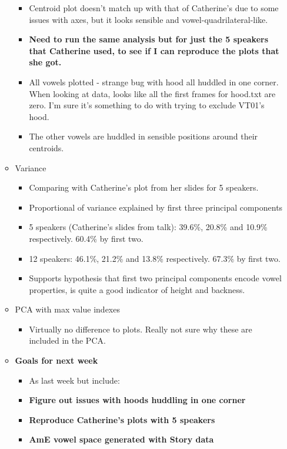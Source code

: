 \documentclass{article}
\begin{document}
\begin{itemize}
\begin{itemize}
\begin{itemize}
            \item Centroid plot doesn't match up with that of Catherine's due to some issues with axes, but it looks sensible and vowel-quadrilateral-like.
            \item \textbf{Need to run the same analysis but for just the 5 speakers that Catherine used, to see if I can reproduce the plots that she got.}
            \item All vowels plotted - strange bug with hood all huddled in one corner. When looking at data, looks like all the first frames for hood.txt are zero. I'm sure it's something to do with trying to exclude VT01's hood.
            \item The other vowels are huddled in sensible positions around their centroids.
        \end{itemize}
        \item Variance
        \begin{itemize}
            \item Comparing with Catherine's plot from her slides for 5 speakers.
            \item Proportional of variance explained by first three principal components
            \item 5 speakers (Catherine's slides from talk): 39.6\%, 20.8\% and 10.9\% respectively. 60.4\% by first two.
            \item 12 speakers: 46.1\%, 21.2\% and 13.8\% respectively. 67.3\% by first two.
            \item Supports hypothesis that first two principal components encode vowel properties, is quite a good indicator of height and backness.
        \end{itemize}
        \item PCA with max value indexes
        \begin{itemize}
            \item Virtually no difference to plots. Really not sure why these are included in the PCA.
        \end{itemize}
        \item \textbf{Goals for next week}
        \begin{itemize}
            \item As last week but include:
            \item \textbf{Figure out issues with hoods huddling in one corner}
            \item \textbf{Reproduce Catherine's plots with 5 speakers}
            \item \textbf{AmE vowel space generated with Story data}

\end{itemize}
\end{itemize}
\end{itemize}
\end{document}
